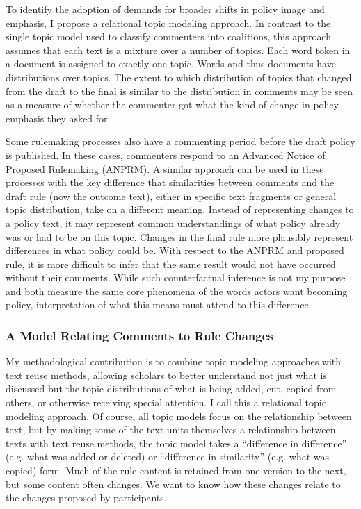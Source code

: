 To identify the adoption of demands for broader shifts in policy image and emphasis, I propose a relational topic modeling approach. In contrast to the single topic model used to classify commenters into coalitions, this approach assumes that each text is a mixture over a number of topics. Each word token in a document is assigned to exactly one topic. Words and thus documents have distributions over topics. The extent to which distribution of topics that changed from the draft to the final is similar to the distribution in comments may be seen as a measure of whether the commenter got what the kind of change in policy emphasis they asked for. 

Some rulemaking processes also have a commenting period before the draft policy is published. In these cases, commenters respond to an Advanced Notice of Proposed Rulemaking (ANPRM). A similar approach can be used in these processes with the key difference that similarities between comments and the draft rule (now the outcome text), either in specific text fragments or general topic distribution, take on a different meaning. Instead of representing changes to a policy text, it may represent common understandings of what policy already was or had to be on this topic. Changes in the final rule more plausibly represent differences in what policy could be. With respect to the ANPRM and proposed rule, it is more difficult to infer that the same result would not have occurred without their comments. While such counterfactual inference is not my purpose and both measure the same core phenomena of the words actors want becoming policy, interpretation of what this means must attend to this difference. 

\subsubsection{A Model Relating Comments to Rule Changes}

My methodological contribution is to combine topic modeling approaches with text reuse methods, allowing scholars to better understand not just what is discussed but the topic distributions of what is being added, cut, copied from others, or otherwise receiving special attention. I call this a relational topic modeling approach. Of course, all topic models focus on the relationship between text, but by making some of the text units themselves a relationship between texts with text reuse methods, the topic model takes a ``difference in difference'' (e.g. what was added or deleted) or ``difference in similarity'' (e.g. what was copied) form. Much of the rule content is retained from one version to the next, but some content often changes. We want to know how these changes relate to the changes proposed by participants. 

